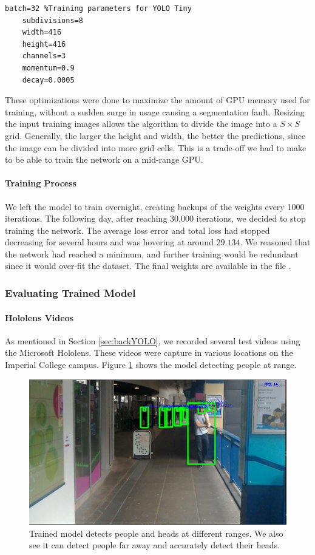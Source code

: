 \begin{lstlisting}[language=Mymatlab,caption={Training parameters used for YOLOv3 Tiny on the CrowdHuman dataset}]
    batch=32 %Training parameters for YOLO Tiny
    subdivisions=8
    width=416
    height=416
    channels=3
    momentum=0.9
    decay=0.0005
\end{lstlisting}

These optimizations were done to maximize the amount of GPU memory used for training, without a sudden surge in usage causing a segmentation fault. Resizing the input training images allows the algorithm to divide the image into a $S\times S$ grid. Generally, the larger the height and width, the better the predictions, since the image can be divided into more grid cells. This is a trade-off we had to make to be able to train the network on a mid-range GPU.

\paragraph{Training Process} We left the model to train overnight, creating backups of the weights every 1000 iterations. The following day, after reaching 30,000 iterations, we decided to stop training the network. The average loss error and total loss had stopped decreasing for several hours and was hovering at around $29.134$. We reasoned that the network had reached a minimum, and further training would be redundant since it would over-fit the dataset. The final weights are available in the file .

\subsubsection{Evaluating Trained Model}
\paragraph{Hololens Videos} As mentioned in Section \ref{sec:backYOLO}, we recorded several test videos using the Microsoft Hololens. These videos were capture in various locations on the Imperial College campus. Figure \ref{fig:yoloRange} shows the model detecting people at range.  

\begin{figure}[ht]
    \centering
    \includegraphics[width=0.5\linewidth]{img/chapter5_implementation/yoloWalkway.png}
    \caption{Trained model detects people and heads at different ranges. We also see it can detect people far away and accurately detect their heads.}
    \label{fig:yoloRange}
\end{figure}

